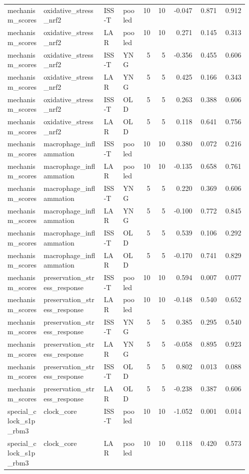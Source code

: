 \documentclass[11pt]{article}
\begin{document}
\begin{landscape}
\begin{longtable}{p{0.15\linewidth}p{0.25\linewidth}p{0.08\linewidth}p{0.08\linewidth}rrrrr}
mechanism\_scores & oxidative\_stress\_nrf2 & ISS-T & pooled & 10 & 10 & -0.047 & 0.871 & 0.912 \\
mechanism\_scores & oxidative\_stress\_nrf2 & LAR & pooled & 10 & 10 & 0.271 & 0.145 & 0.313 \\
mechanism\_scores & oxidative\_stress\_nrf2 & ISS-T & YNG & 5 & 5 & -0.356 & 0.455 & 0.606 \\
mechanism\_scores & oxidative\_stress\_nrf2 & LAR & YNG & 5 & 5 & 0.425 & 0.166 & 0.343 \\
mechanism\_scores & oxidative\_stress\_nrf2 & ISS-T & OLD & 5 & 5 & 0.263 & 0.388 & 0.606 \\
mechanism\_scores & oxidative\_stress\_nrf2 & LAR & OLD & 5 & 5 & 0.118 & 0.641 & 0.756 \\
mechanism\_scores & macrophage\_inflammation & ISS-T & pooled & 10 & 10 & 0.380 & 0.072 & 0.216 \\
mechanism\_scores & macrophage\_inflammation & LAR & pooled & 10 & 10 & -0.135 & 0.658 & 0.761 \\
mechanism\_scores & macrophage\_inflammation & ISS-T & YNG & 5 & 5 & 0.220 & 0.369 & 0.606 \\
mechanism\_scores & macrophage\_inflammation & LAR & YNG & 5 & 5 & -0.100 & 0.772 & 0.845 \\
mechanism\_scores & macrophage\_inflammation & ISS-T & OLD & 5 & 5 & 0.539 & 0.106 & 0.292 \\
mechanism\_scores & macrophage\_inflammation & LAR & OLD & 5 & 5 & -0.170 & 0.741 & 0.829 \\
mechanism\_scores & preservation\_stress\_response & ISS-T & pooled & 10 & 10 & 0.594 & 0.007 & 0.077 \\
mechanism\_scores & preservation\_stress\_response & LAR & pooled & 10 & 10 & -0.148 & 0.540 & 0.652 \\
mechanism\_scores & preservation\_stress\_response & ISS-T & YNG & 5 & 5 & 0.385 & 0.295 & 0.540 \\
mechanism\_scores & preservation\_stress\_response & LAR & YNG & 5 & 5 & -0.058 & 0.895 & 0.923 \\
mechanism\_scores & preservation\_stress\_response & ISS-T & OLD & 5 & 5 & 0.802 & 0.013 & 0.088 \\
mechanism\_scores & preservation\_stress\_response & LAR & OLD & 5 & 5 & -0.238 & 0.387 & 0.606 \\
special\_clock\_s1p\_rbm3 & clock\_core & ISS-T & pooled & 10 & 10 & -1.052 & 0.001 & 0.014 \\
special\_clock\_s1p\_rbm3 & clock\_core & LAR & pooled & 10 & 10 & 0.118 & 0.420 & 0.573 \\

\end{longtable}
\end{landscape}
\end{document}
